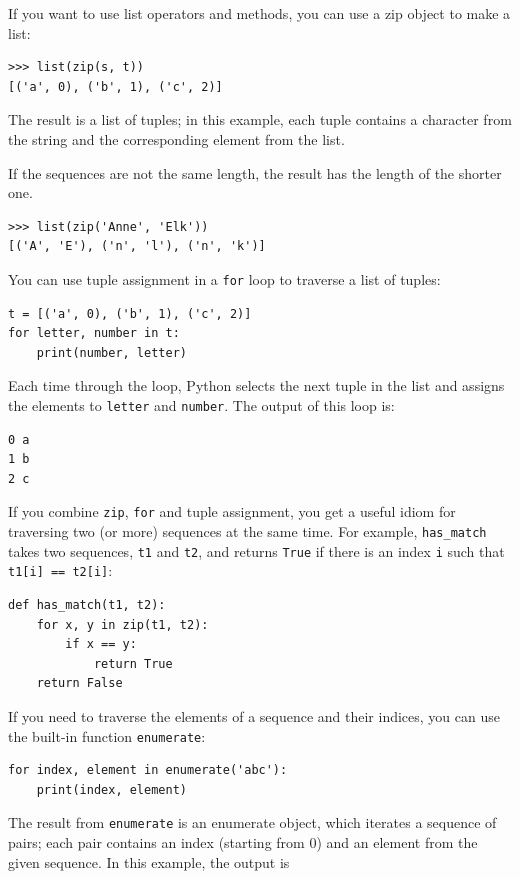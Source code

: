 \documentclass[10pt]{book}
\begin{document}
If you want to use list operators and methods, you can
use a zip object to make a list:

\begin{verbatim}
>>> list(zip(s, t))
[('a', 0), ('b', 1), ('c', 2)]
\end{verbatim}
%
The result is a list of tuples; in this example, each tuple contains
a character from the string and the corresponding element from
the list.

If the sequences are not the same length, the result has the
length of the shorter one.

\begin{verbatim}
>>> list(zip('Anne', 'Elk'))
[('A', 'E'), ('n', 'l'), ('n', 'k')]
\end{verbatim}
%
You can use tuple assignment in a {\tt for} loop to traverse a list of
tuples:

\begin{verbatim}
t = [('a', 0), ('b', 1), ('c', 2)]
for letter, number in t:
    print(number, letter)
\end{verbatim}
%
Each time through the loop, Python selects the next tuple in
the list and assigns the elements to {\tt letter} and 
{\tt number}.  The output of this loop is:

\begin{verbatim}
0 a
1 b
2 c
\end{verbatim}
%
If you combine {\tt zip}, {\tt for} and tuple assignment, you get a
useful idiom for traversing two (or more) sequences at the same
time.  For example, \verb"has_match" takes two sequences, {\tt t1} and
{\tt t2}, and returns {\tt True} if there is an index {\tt i}
such that {\tt t1[i] == t2[i]}:

\begin{verbatim}
def has_match(t1, t2):
    for x, y in zip(t1, t2):
        if x == y:
            return True
    return False
\end{verbatim}
%
If you need to traverse the elements of a sequence and their
indices, you can use the built-in function {\tt enumerate}:

\begin{verbatim}
for index, element in enumerate('abc'):
    print(index, element)
\end{verbatim}
%
The result from {\tt enumerate} is an enumerate object, which
iterates a sequence of pairs; each pair contains an index (starting
from 0) and an element from the given sequence.
In this example, the output is
\end{document}
